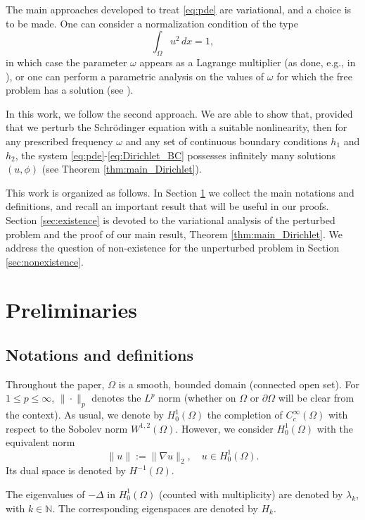 \documentclass[10pt,a4paper]{amsart}
\numberwithin{equation}{section}
\begin{document}
The main approaches developed to treat \eqref{eq:pde} are variational, and a choice is 
to be made. One can consider a normalization condition of the type
\[
 \int_\Omega u^2 \,dx = 1,
\]
in which case the parameter $\omega$ appears as a Lagrange multiplier (as done, e.g., 
in \cite{BenciFortunato1998, PisaniSiciliano2013, AfonsoSiciliano2021}), or one can 
perform a parametric analysis on the values of $\omega$ for which the free problem has 
a solution (see \cite{PisaniSiciliano2007b}).

In this work, we follow the second approach. We are able to show that, provided that we 
perturb the Schr\"odinger equation with a suitable nonlinearity, then for any prescribed 
frequency $\omega$ and any set of continuous boundary conditions $h_1$ and $h_2$, 
the system \eqref{eq:pde}-\eqref{eq:Dirichlet_BC} possesses infinitely many solutions 
$(u, \phi)$ (see Theorem \ref{thm:main_Dirichlet}).

This work is organized as follows. In Section \ref{sec:prelim} we collect the main 
notations and definitions, and recall an important result that will be useful in our 
proofs. Section \ref{sec:existence} is devoted to the variational analysis of the 
perturbed problem and the proof of our main result, Theorem \ref{thm:main_Dirichlet}. 
We address the question of non-existence for the unperturbed problem in 
Section \ref{sec:nonexistence}.

\section{Preliminaries}
\label{sec:prelim}

\subsection{Notations and definitions}

Throughout the paper, $\Omega$ is a smooth, bounded domain (connected open set). 
For $1 \leq p \leq \infty$, $\|\cdot\|_p$ denotes the $L^p$ norm (whether on $\Omega$ 
or $\partial\Omega$ will be clear from the context). As usual, we denote by $H_0^1(\Omega)$ the
completion of $C_c^\infty(\Omega)$ with respect to the Sobolev norm $W^{1, 2}(\Omega)$. 
However, we consider $H_0^1(\Omega)$ with the equivalent norm
\[
 \|u\| := \|\nabla u\|_2, \quad u \in H_0^1(\Omega).
\]
Its dual space is denoted by $H^{-1}(\Omega)$.

The eigenvalues of $- \Delta$ in $H_0^1(\Omega)$ (counted with multiplicity) are 
denoted by $\lambda_k$, with $k \in \mathbb N$. The corresponding eigenspaces are denoted 
by $H_k$.
\end{document}
